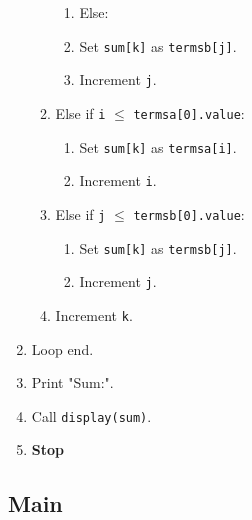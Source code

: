 \begin{enumerate}[label=\arabic*:,left=0pt]
\begin{enumerate}[label=4.\arabic*:]
\begin{enumerate}[label=4.1.\arabic*:]
                  \item Else:
                  \item Set \texttt{sum[k]} as \texttt{termsb[j]}.
                  \item Increment \texttt{j}.
                \end{enumerate}
          \item Else if \texttt{i} $\leq$ \texttt{termsa[0].value}:
                \begin{enumerate}[label=4.2.\arabic*:]
                  \item Set \texttt{sum[k]} as \texttt{termsa[i]}.
                  \item Increment \texttt{i}.
                \end{enumerate}
          \item Else if \texttt{j} $\leq$ \texttt{termsb[0].value}:
                \begin{enumerate}[label=4.3.\arabic*:]
                  \item Set \texttt{sum[k]} as \texttt{termsb[j]}.
                  \item Increment \texttt{j}.
                \end{enumerate}
          \item Increment \texttt{k}.
        \end{enumerate}
  \item Loop end.
  \item Print "Sum:".
  \item Call \texttt{display(sum)}.
  \item \textbf{Stop}
\end{enumerate}

\subsection{Main}

